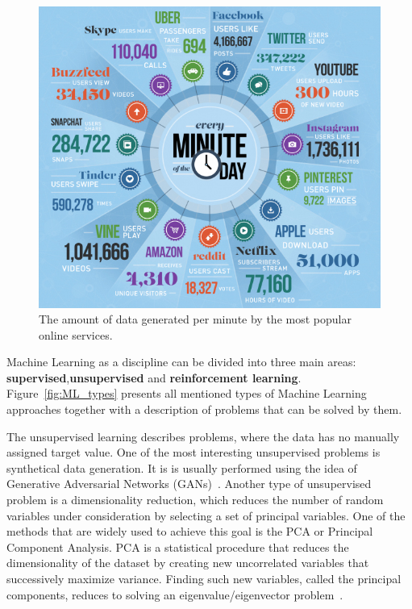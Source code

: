 \begin{figure}[h]
\centering
\includegraphics[scale=0.8]{figures/big_data.jpg}
\caption{The amount of data generated per minute by the most popular online services.
\label{fig:big_data}}
\end{figure}

Machine Learning as a discipline can be divided into three main areas: \textbf{supervised},\textbf{unsupervised} and \textbf{reinforcement learning}. Figure~\ref{fig:ML_types} presents all mentioned types of Machine Learning approaches together with a description of problems that can be solved by them. 

The unsupervised learning describes problems, where the data has no manually assigned target value. One of the most interesting unsupervised problems is synthetical data generation. It is is usually performed using the idea of Generative Adversarial Networks (GANs)~\cite{GAN}. Another type of unsupervised problem is a dimensionality reduction, which reduces the number of random variables under consideration by selecting a set of principal variables. 
One of the methods that are widely used to achieve this goal is the PCA or Principal Component Analysis. 
PCA is a statistical procedure that reduces the dimensionality of the dataset by creating new uncorrelated variables that successively maximize variance. Finding such new variables, called the principal components, reduces to solving an eigenvalue/eigenvector problem~\cite{PCA}. 

